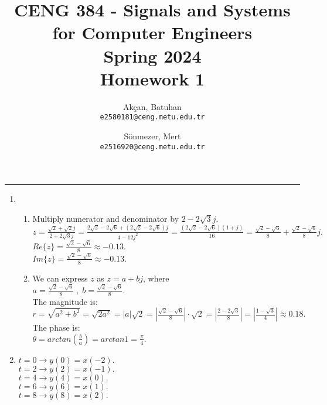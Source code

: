 \documentclass[10pt,a4paper, margin=1in]{article}
\author{
  Akçan, Batuhan\\
  \texttt{e2580181@ceng.metu.edu.tr}
  \and
  Sönmezer, Mert\\
  \texttt{e2516920@ceng.metu.edu.tr}
}
\title{CENG 384 - Signals and Systems for Computer Engineers \\
Spring 2024 \\
Homework 1}
\begin{document}
\maketitle



\noindent\rule{19cm}{1.2pt}

\begin{enumerate}

\item %
    \begin{enumerate}
    \item %
    Multiply numerator and denominator by $2-2\sqrt{3}j.$\vspace{0.3cm}\\
    $z = \frac{\sqrt{2}+\sqrt{2}j}{2+2\sqrt{3}j} = \frac{2\sqrt{2}-2\sqrt{6} + (2\sqrt{2}-2\sqrt{6})j}{4-12j^2} = \frac{(2\sqrt{2}-2\sqrt{6})(1+j)}{16} = \frac{\sqrt{2}-\sqrt{6}}{8} + \frac{\sqrt{2}-\sqrt{6}}{8}j.$\vspace{0.3cm}\\
    $Re\{z\} = \frac{\sqrt{2}-\sqrt{6}}{8} \approx -0.13.$\vspace{0.3cm}\\
    $Im\{z\} = \frac{\sqrt{2}-\sqrt{6}}{8} \approx -0.13.$\vspace{0.3cm}
    \item %
    We can express $z$ as $z = a + bj$, where\vspace{0.3cm}\\
    $a = \frac{\sqrt{2}-\sqrt{6}}{8} \;,\; b = \frac{\sqrt{2}-\sqrt{6}}{8}.$\vspace{0.3cm}\\
    The magnitude is:\vspace{0.3cm}\\
    $r = \sqrt{a^2+b^2} = \sqrt{2a^2} = |a|\sqrt{2} = |\frac{\sqrt{2}-\sqrt{6}}{8}| \cdot \sqrt{2} = |\frac{2-2\sqrt{3}}{8}| = |\frac{1-\sqrt{3}}{4}| \approx 0.18.$\vspace{0.3cm}\\
    The phase is:\vspace{0.3cm}\\
    $\theta = arctan(\frac{b}{a}) = arctan1 = \frac{\pi}{4}.$\vspace{0.3cm}\\
    \end{enumerate}

\item %
$t=0 \rightarrow y(0) = x(-2).$\vspace{0.3cm}\\
$t=2 \rightarrow y(2) = x(-1).$\vspace{0.3cm}\\
$t=4 \rightarrow y(4) = x(0).$\vspace{0.3cm}\\
$t=6 \rightarrow y(6) = x(1).$\vspace{0.3cm}\\
$t=8 \rightarrow y(8) = x(2).$\vspace{0.3cm}\\


\end{enumerate}
\end{document}
